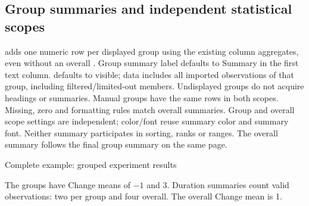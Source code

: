 \subsection{Group summaries and independent statistical scopes}
\begin{sloppypar}
 adds one numeric row per displayed group using the
existing column aggregates, even without an overall .
Group summary label defaults to Summary in the first text column.
 defaults to visible; data includes all
imported observations of that group, including filtered/limited-out members.
Undisplayed groups do not acquire headings or summaries. Manual groups have
the same rows in both scopes. Missing, zero and formatting rules match overall
summaries. Group and overall scope settings are independent; color/font reuse
summary color and summary font. Neither summary participates in sorting, ranks
or ranges. The overall summary follows the final group summary on the same page.
\end{sloppypar}
\begin{demo}{Complete example: grouped experiment results}
\begin{center}
\begin{gradtable}[align=c,header align=c,data=experiments,width=\linewidth,theme=violet,
  group by=batch,group summary=true,group summary label={Group summary},
  sort keys={change/descending,duration/ascending}]
\end{gradtable}
\end{center}
\end{demo}
The groups have Change means of $-1$ and 3. Duration summaries count valid
observations: two per group and four overall. The overall Change mean is 1.
